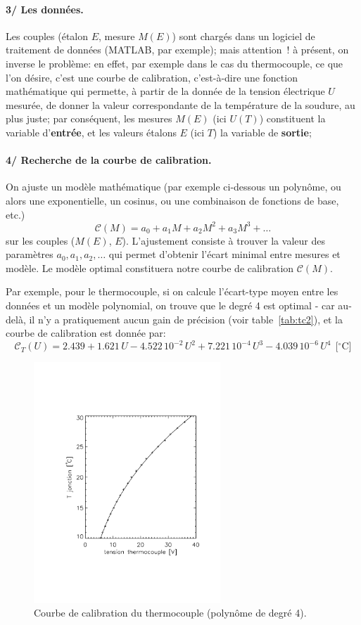 \paragraph{3/ Les données.} Les couples (étalon $E$, mesure $M(E)$) sont chargés dans un logiciel de traitement de données (MATLAB, par exemple); mais attention~! à présent, on inverse le problème: en effet, par exemple dans le cas du thermocouple, ce que l'on désire, c'est une courbe de calibration, c'est-à-dire une fonction mathématique qui permette, à partir de la donnée de la tension électrique $U$ mesurée, de donner la valeur correspondante de la température de la soudure, au plus juste; par conséquent, les mesures $M(E)$ (ici $U(T)$) constituent la variable d'\textbf{entrée}, et les valeurs étalons $E$ (ici $T$) la variable de \textbf{sortie};

\paragraph{4/ Recherche de la courbe de calibration.} On ajuste un modèle mathématique (par exemple ci-dessous un polynôme, ou alors une exponentielle, un cosinus, ou une combinaison de fonctions de base, etc.) $$\mathcal{C}(M)=a_0+a_1M+a_2M^2+a_3M^3+\dots$$ sur les couples ($M(E)$, $E$). L'ajustement consiste à trouver la valeur des paramètres $a_0, a_1, a_2,\dots$ qui permet d'obtenir l'écart minimal entre mesures et modèle. Le modèle optimal constituera notre courbe de calibration $\mathcal{C}(M)$.

Par exemple, pour le thermocouple, si on calcule l'écart-type moyen entre les données et un modèle polynomial, on trouve que le degré 4 est optimal - car au-delà, il n'y a pratiquement aucun gain de précision (voir table~\ref{tab:tc2}), et la courbe de calibration est donnée par:
\begin{equation*}
    \mathcal{C}_T(U)=2.439+1.621\,U-4.522\,10^{-2}\,U^2+7.221\,10^{-4}\,U^3-4.039\,10^{-6}\,U^4\ \ \text{[$^\circ$C]}
\end{equation*}

\begin{figure}
    \vspace{-0mm}
    \centering
    \includegraphics[width=7cm]{assets/figures/calibThermoCouple.pdf}
    \caption{Courbe de calibration du thermocouple (polynôme de degré 4).}
    \label{fig:tc}
\end{figure}
